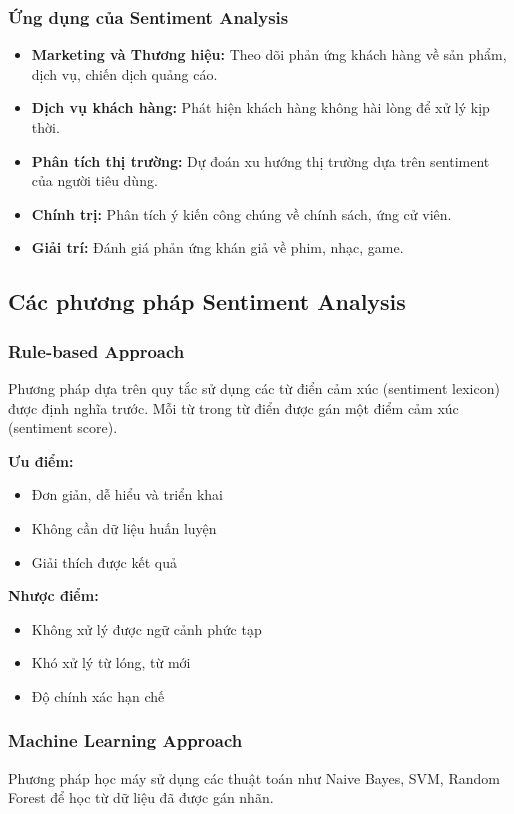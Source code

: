 \subsubsection{Ứng dụng của Sentiment Analysis}
\begin{itemize}
    \item \textbf{Marketing và Thương hiệu:} Theo dõi phản ứng khách hàng về sản phẩm, dịch vụ, chiến dịch quảng cáo.
    \item \textbf{Dịch vụ khách hàng:} Phát hiện khách hàng không hài lòng để xử lý kịp thời.
    \item \textbf{Phân tích thị trường:} Dự đoán xu hướng thị trường dựa trên sentiment của người tiêu dùng.
    \item \textbf{Chính trị:} Phân tích ý kiến công chúng về chính sách, ứng cử viên.
    \item \textbf{Giải trí:} Đánh giá phản ứng khán giả về phim, nhạc, game.
\end{itemize}

\subsection{Các phương pháp Sentiment Analysis}

\subsubsection{Rule-based Approach}
Phương pháp dựa trên quy tắc sử dụng các từ điển cảm xúc (sentiment lexicon) được định nghĩa trước. Mỗi từ trong từ điển được gán một điểm cảm xúc (sentiment score).

\textbf{Ưu điểm:}
\begin{itemize}
    \item Đơn giản, dễ hiểu và triển khai
    \item Không cần dữ liệu huấn luyện
    \item Giải thích được kết quả
\end{itemize}

\textbf{Nhược điểm:}
\begin{itemize}
    \item Không xử lý được ngữ cảnh phức tạp
    \item Khó xử lý từ lóng, từ mới
    \item Độ chính xác hạn chế
\end{itemize}

\subsubsection{Machine Learning Approach}
Phương pháp học máy sử dụng các thuật toán như Naive Bayes, SVM, Random Forest để học từ dữ liệu đã được gán nhãn.

